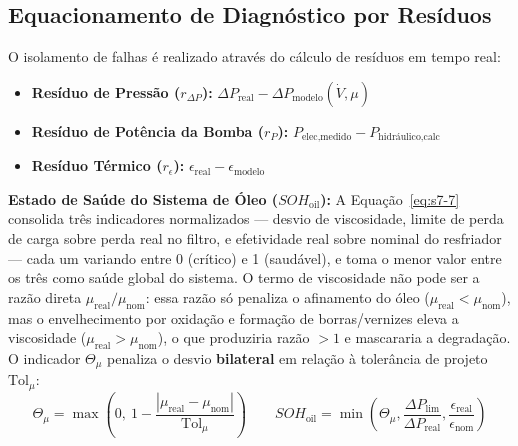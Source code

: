 \documentclass[12pt,a4paper]{article}
\numberwithin{equation}{section}
\numberwithin{table}{section}
\numberwithin{figure}{section}
\begin{document}
	\subsection{\textbf{Equacionamento de Diagnóstico por Resíduos}}
	O isolamento de falhas é realizado através do cálculo de resíduos em tempo real:
	\begin{itemize}
		\item \textbf{Resíduo de Pressão ($r_{\Delta P}$):} $ \Delta P_{\text{real}} - \Delta P_{\text{modelo}}(\dot{V}, \mu) $
		\item \textbf{Resíduo de Potência da Bomba ($r_{P}$):} $ P_{\text{elec,medido}} - P_{\text{hidráulico,calc}} $
		\item \textbf{Resíduo Térmico ($r_{\epsilon}$):} $ \epsilon_{\text{real}} - \epsilon_{\text{modelo}} $
	\end{itemize}
	
	\vspace{1em}
	\textbf{Estado de Saúde do Sistema de Óleo ($SOH_{\text{oil}}$):} A Equação~\eqref{eq:s7-7} consolida três indicadores normalizados — desvio de viscosidade, limite de perda de carga sobre perda real no filtro, e efetividade real sobre nominal do resfriador — cada um variando entre 0 (crítico) e 1 (saudável), e toma o menor valor entre os três como saúde global do sistema. O termo de viscosidade não pode ser a razão direta $\mu_{\text{real}}/\mu_{\text{nom}}$: essa razão só penaliza o afinamento do óleo ($\mu_{\text{real}} < \mu_{\text{nom}}$), mas o envelhecimento por oxidação e formação de borras/vernizes eleva a viscosidade ($\mu_{\text{real}} > \mu_{\text{nom}}$), o que produziria razão $>1$ e mascararia a degradação. O indicador $\Theta_\mu$ penaliza o desvio \textbf{bilateral} em relação à tolerância de projeto $\text{Tol}_\mu$:
	\begin{equation}\label{eq:s7-7}
 \Theta_\mu = \max\left(0,\ 1 - \frac{|\mu_{\text{real}} - \mu_{\text{nom}}|}{\text{Tol}_\mu}\right) \qquad \boxed{SOH_{\text{oil}} = \min \left( \Theta_\mu, \frac{\Delta P_{\text{lim}}}{\Delta P_{\text{real}}}, \frac{\epsilon_{\text{real}}}{\epsilon_{\text{nom}}} \right)}
\end{equation}
\end{document}
